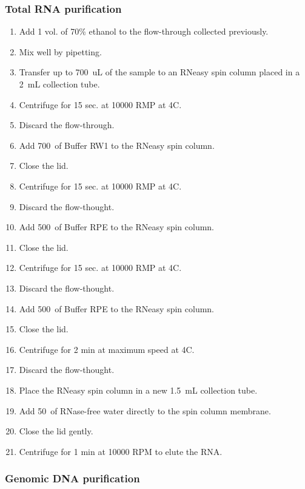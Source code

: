 \subsubsection{Total RNA purification}

\begin{enumerate}
\item Add 1 vol. of 70\% ethanol to the flow-through collected previously. 
\item Mix well by pipetting.
\item Transfer up to 700~uL of the sample to an RNeasy spin column placed in a 2~mL collection tube.
\item Centrifuge for 15 sec. at 10000 RMP at 4\degree C.
\item Discard the flow-through.
\item Add 700~\uL of Buffer RW1 to the RNeasy spin column.
\item Close the lid.
\item Centrifuge for 15 sec. at 10000 RMP at 4\degree C.
\item Discard the flow-thought.
\item Add 500~\uL of Buffer RPE to the RNeasy spin column.
\item Close the lid.
\item Centrifuge for 15 sec. at 10000 RMP at 4\degree C.
\item Discard the flow-thought.
\item Add 500~\uL of Buffer RPE to the RNeasy spin column.
\item Close the lid.
\item Centrifuge for 2 min at maximum speed at 4\degree C.
\item Discard the flow-thought.
\item Place the RNeasy spin column in a new 1.5~mL collection tube.
\item Add 50~\uL of RNase-free water directly to the spin column membrane. 
\item Close the lid gently.
\item Centrifuge for 1 min at 10000 RPM to elute the RNA.
\end{enumerate}

\subsubsection{Genomic DNA purification}

